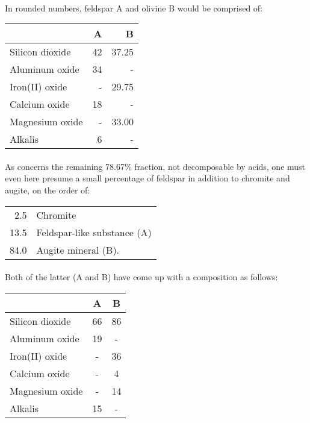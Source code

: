 \documentclass[a4paper, 12pt, oneside]{article}
\begin{document}
\paragraph{}
In rounded numbers, feldspar A and olivine B would be comprised of:
\begin{center}
    \begin{tabular}{|l|r|r|}
        \hline
        & A & B\\\hline
        Silicon dioxide & 42 & 37.25\\\hline
        Aluminum oxide & 34 & -\\\hline
        Iron(II) oxide & - & 29.75\\\hline
        Calcium oxide & 18 & -\\\hline
        Magnesium oxide & - & 33.00\\\hline
        Alkalis & 6 & -\\
        \hline
    \end{tabular}
\end{center}
\paragraph{}
As concerns the remaining 78.67\% fraction, not decomposable by acids, one must even here presume a small percentage of feldspar in addition to chromite and augite, on the order of:
\begin{center}
    \begin{tabular}{r l}
        2.5 & Chromite\\
        13.5 & Feldspar-like substance (A)\\
        84.0 & Augite mineral (B).\\
    \end{tabular}
\end{center}
\paragraph{}
Both of the latter (A and B) have come up with a composition as follows:
\begin{center}
    \begin{tabular}{|l|c|c|}
        \hline
        & A & B\\\hline
        Silicon dioxide & 66 & 86\\\hline
        Aluminum oxide & 19 & -\\\hline
        Iron(II) oxide & - & 36\\\hline
        Calcium oxide & - & 4\\\hline
        Magnesium oxide & - & 14\\\hline
        Alkalis & 15 & -\\
        \hline
    \end{tabular}
\end{center}
\end{document}
